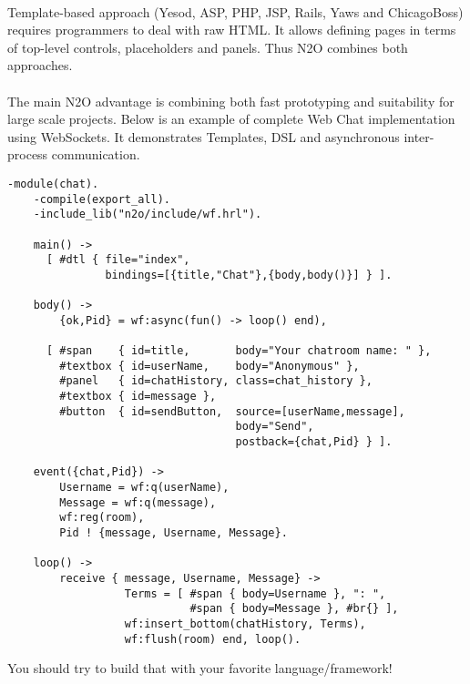 \paragraph{}
Template-based approach (Yesod, ASP, PHP, JSP, Rails, Yaws and ChicagoBoss)
requires programmers to deal with raw HTML. It allows
defining pages in terms of top-level controls, placeholders
and panels. Thus N2O combines both approaches.

\paragraph{}
The main N2O advantage is combining both fast prototyping and suitability for large
scale projects. Below is an example of complete Web Chat implementation using
WebSockets. It demonstrates Templates, DSL and asynchronous
inter-process communication.

\newpage
\vspace{1\baselineskip}
\begin{lstlisting}[caption=chat.erl]
    -module(chat).
    -compile(export_all).
    -include_lib("n2o/include/wf.hrl").

    main() -> 
      [ #dtl { file="index", 
               bindings=[{title,"Chat"},{body,body()}] } ].

    body() ->
        {ok,Pid} = wf:async(fun() -> loop() end),

      [ #span    { id=title,       body="Your chatroom name: " }, 
        #textbox { id=userName,    body="Anonymous" },
        #panel   { id=chatHistory, class=chat_history },
        #textbox { id=message },
        #button  { id=sendButton,  source=[userName,message],
                                   body="Send", 
                                   postback={chat,Pid} } ].

    event({chat,Pid}) ->
        Username = wf:q(userName),
        Message = wf:q(message),
        wf:reg(room),
        Pid ! {message, Username, Message}.

    loop() ->
        receive { message, Username, Message} ->
                  Terms = [ #span { body=Username }, ": ",
                            #span { body=Message }, #br{} ],
                  wf:insert_bottom(chatHistory, Terms),
                  wf:flush(room) end, loop().
\end{lstlisting}
\vspace{1\baselineskip}

You should try to build that with your favorite language/framework!


